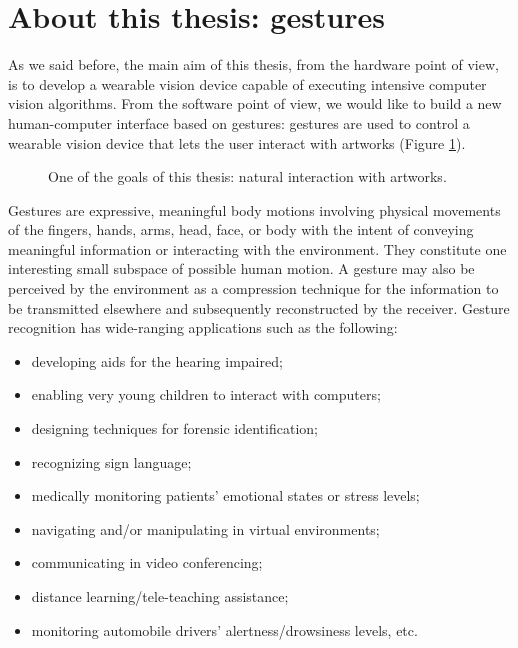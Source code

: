 \section{About this thesis: gestures}
As we said before, the main aim of this thesis, from the hardware point of view, is to develop a wearable vision device capable of executing intensive computer vision algorithms. From the software point of view, we would like to build a new human-computer interface based on gestures: gestures are used to control a wearable vision device that lets the user interact with artworks (Figure \ref{fig:interaction}).

\begin{figure}[tb]
\centering
{}
\caption{One of the goals of this thesis: natural interaction with artworks.}
\label{fig:interaction}
\end{figure}

Gestures are expressive, meaningful body motions involving physical movements of the fingers, hands, arms, head, face, or
body with the intent of conveying meaningful information or interacting with the environment. They constitute one interesting
small subspace of possible human motion. A gesture may also be perceived by the environment as a compression technique for the information to be transmitted elsewhere and subsequently reconstructed by the receiver. Gesture recognition has wide-ranging applications such as the following:
\begin{itemize}
\item developing aids for the hearing impaired;
\item  enabling very young children to interact with computers;
\item  designing techniques for forensic identification;
\item recognizing sign language;
\item medically monitoring patients’ emotional states or stress
levels;
\item navigating and/or manipulating in virtual environments;
\item communicating in video conferencing;
\item distance learning/tele-teaching assistance;
\item monitoring automobile drivers' alertness/drowsiness
levels, etc.
\end{itemize}

